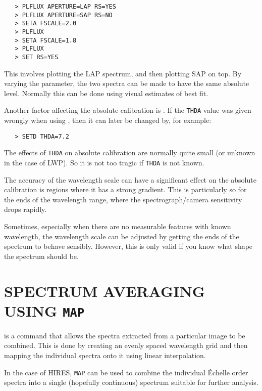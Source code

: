 \begin{verbatim}
   > PLFLUX APERTURE=LAP RS=YES
   > PLFLUX APERTURE=SAP RS=NO
   > SETA FSCALE=2.0
   > PLFLUX
   > SETA FSCALE=1.8
   > PLFLUX
   > SET RS=YES
\end{verbatim}

This involves plotting the LAP spectrum, and then plotting SAP on top.  By
varying the 
 parameter, the two spectra can be made to have the
same absolute level.  Normally this can be done using visual estimates of best
fit.

Another factor affecting the absolute calibration is
\@.  If the
\verb+THDA+ value was given wrongly when using
, then it can
later be changed by, for example:

\begin{verbatim}
   > SETD THDA=7.2
\end{verbatim}

The effects of \verb+THDA+ on absolute calibration are normally quite small (or
unknown in the case of LWP)\@.  So it is not too tragic if \verb+THDA+ is not
known.

The accuracy of the wavelength scale can have a significant effect on the
absolute calibration is regions where it has a strong gradient.  This is
particularly so for the ends of the wavelength range, where the
spectrograph/camera sensitivity drops rapidly.

Sometimes, especially when there are no measurable features with known
wavelength, the wavelength scale can be adjusted by getting the ends of the
spectrum to behave sensibly.  However, this is only valid if you know what
shape the spectrum should be.


\section{\label{se:map}SPECTRUM AVERAGING USING {\tt MAP}}

 is a command that allows the spectra extracted from a particular
image to be combined.  This is done by creating an evenly spaced wavelength
grid and then mapping the individual spectra onto it using linear interpolation.

In the case of HIRES, \verb+MAP+ can be used to combine the individual
\'{E}chelle order spectra into a single (hopefully continuous) spectrum suitable
for further analysis.

